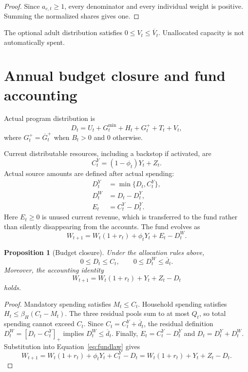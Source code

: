 \documentclass[11pt]{article}
\newtheorem{proposition}[definition]{Proposition}
\newcommand{\pos}[1]{\left[#1\right]_{+}}
\begin{document}
\begin{proof}
Since $a_{c,t}\ge1$, every denominator and every individual weight is positive. Summing
the normalized shares gives one.
\end{proof}

The optional adult distribution satisfies $0\le V_t\le\overline V_t$. Unallocated
capacity is not automatically spent.

\section{Annual budget closure and fund accounting}

Actual program distribution is
\begin{equation}
  D_t=U_t+G_t^{\min}+H_t+G_t^{+}+T_t+V_t,
\end{equation}
where $G_t^{+}=\overline G_t^{+}$ when $B_t>0$ and $0$ otherwise.

Current distributable resources, including a backstop if activated, are
\begin{equation}
  C_t^Y=(1-\phi_t)Y_t+Z_t.
\end{equation}
Actual source amounts are defined after actual spending:
\begin{align}
  D_t^Y&=\min\{D_t,C_t^Y\},\\
  D_t^W&=D_t-D_t^Y,\\
  E_t&=C_t^Y-D_t^Y.
\end{align}
Here $E_t\ge0$ is unused current revenue, which is transferred to the fund rather than
silently disappearing from the accounts. The fund evolves as
\begin{equation}\label{eq:fundlaw}
  W_{t+1}=W_t(1+r_t)+\phi_tY_t+E_t-D_t^W.
\end{equation}

\begin{proposition}[Budget closure]
Under the allocation rules above,
\begin{equation}
  0\le D_t\le C_t,
  \qquad
  0\le D_t^W\le\overline d_t.
\end{equation}
Moreover, the accounting identity
\begin{equation}
  W_{t+1}=W_t(1+r_t)+Y_t+Z_t-D_t
\end{equation}
holds.
\end{proposition}

\begin{proof}
Mandatory spending satisfies $M_t\le C_t$. Household spending satisfies
$H_t\le\beta_H(C_t-M_t)$. The three residual pools sum to at most $Q_t$, so total
spending cannot exceed $C_t$. Since $C_t=C_t^Y+\overline d_t$, the residual definition
$D_t^W=\pos{D_t-C_t^Y}$ implies $D_t^W\le\overline d_t$. Finally,
$E_t=C_t^Y-D_t^Y$ and $D_t=D_t^Y+D_t^W$. Substitution into
Equation~\eqref{eq:fundlaw} gives
\[
W_{t+1}=W_t(1+r_t)+\phi_tY_t+C_t^Y-D_t
=W_t(1+r_t)+Y_t+Z_t-D_t.
\]
\end{proof}
\end{document}
